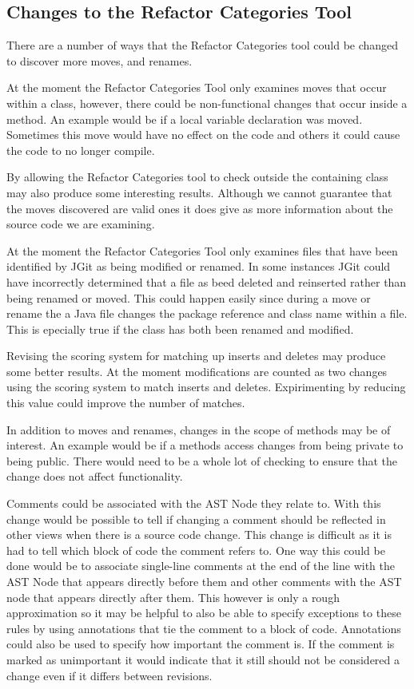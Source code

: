 \subsection{Changes to the Refactor Categories Tool}
There are a number of ways that the Refactor Categories tool could be changed to discover more moves, and renames.

At the moment the Refactor Categories Tool only examines moves that occur within a class, however, there could be non-functional changes that occur inside a method. 
An example would be if a local variable declaration was moved.
Sometimes this move would have no effect on the code and others it could cause the code to no longer compile.

By allowing the Refactor Categories tool to check outside the containing class may also produce some interesting results.
Although we cannot guarantee that the moves discovered are valid ones it does give as more information about the source code we are examining.

At the moment the Refactor Categories Tool only examines files that have been identified by JGit as being modified or renamed.
In some instances JGit could have incorrectly determined that a file as beed deleted and reinserted rather than being renamed or moved.
This could happen easily since during a move or rename the a Java file changes the package reference and class name within a file.
This is epecially true if the class has both been renamed and modified.
   
Revising the scoring system for matching up inserts and deletes may produce some better results.
At the moment modifications are counted as two changes using the scoring system to match inserts and deletes.
Expirimenting by reducing this value could improve the number of matches.

In addition to moves and renames, changes in the scope of methods may be of interest.
An example would be if a methods access changes from being private to being public.
There would need to be a whole lot of checking to ensure that the change does not affect functionality.

Comments could be associated with the AST Node they relate to.  
With this change would be possible to tell if changing a comment should be reflected in other views when there is a source code change. 
This change is difficult as it is had to tell which block of code the comment refers to.  
One way this could be done would be to associate single-line comments at the end of the line with the AST Node that appears directly before them and other comments with the AST node that appears directly after them.  
This however is only a rough approximation so it may be helpful to also be able to specify exceptions to these rules by using annotations that tie the comment to a block of code. Annotations could also be used to specify how important the comment is.
If the comment is marked as unimportant it would indicate that it still should not be considered a change even if it differs between revisions.

